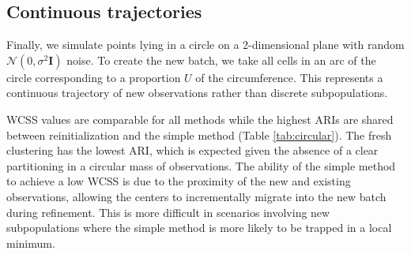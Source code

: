 \documentclass{article}
\begin{document}
\subsection{Continuous trajectories}

Finally, we simulate points lying in a circle on a 2-dimensional plane with random $\mathcal{N}(0, \sigma^2\mathbf{I})$ noise.
To create the new batch, we take all cells in an arc of the circle corresponding to a proportion $U$ of the circumference.
This represents a continuous trajectory of new observations rather than discrete subpopulations.

WCSS values are comparable for all methods while the highest ARIs are shared between reinitialization and the simple method (Table \ref{tab:circular}).
The fresh clustering has the lowest ARI, which is expected given the absence of a clear partitioning in a circular mass of observations.
The ability of the simple method to achieve a low WCSS is due to the proximity of the new and existing observations,
allowing the centers to incrementally migrate into the new batch during refinement.
This is more difficult in scenarios involving new subpopulations where the simple method is more likely to be trapped in a local minimum.
\end{document}
